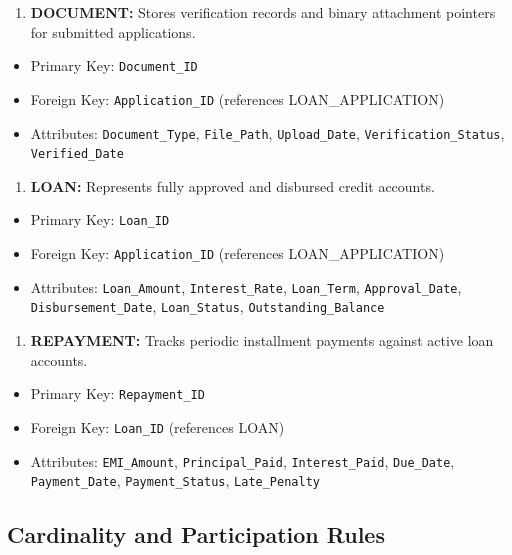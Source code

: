 \begin{enumerate}
  \item \textbf{DOCUMENT:} Stores verification records and binary attachment pointers for submitted applications.
\end{enumerate}

\begin{itemize}
  \item Primary Key: \texttt{Document\_ID}
  \item Foreign Key: \texttt{Application\_ID} (references LOAN\_APPLICATION)
  \item Attributes: \texttt{Document\_Type}, \texttt{File\_Path}, \texttt{Upload\_Date}, \texttt{Verification\_Status}, \texttt{Verified\_Date}
\end{itemize}

\begin{enumerate}
  \item \textbf{LOAN:} Represents fully approved and disbursed credit accounts.
\end{enumerate}

\begin{itemize}
  \item Primary Key: \texttt{Loan\_ID}
  \item Foreign Key: \texttt{Application\_ID} (references LOAN\_APPLICATION)
  \item Attributes: \texttt{Loan\_Amount}, \texttt{Interest\_Rate}, \texttt{Loan\_Term}, \texttt{Approval\_Date}, \texttt{Disbursement\_Date}, \texttt{Loan\_Status}, \texttt{Outstanding\_Balance}
\end{itemize}

\begin{enumerate}
  \item \textbf{REPAYMENT:} Tracks periodic installment payments against active loan accounts.
\end{enumerate}

\begin{itemize}
  \item Primary Key: \texttt{Repayment\_ID}
  \item Foreign Key: \texttt{Loan\_ID} (references LOAN)
  \item Attributes: \texttt{EMI\_Amount}, \texttt{Principal\_Paid}, \texttt{Interest\_Paid}, \texttt{Due\_Date}, \texttt{Payment\_Date}, \texttt{Payment\_Status}, \texttt{Late\_Penalty}
\end{itemize}

\subsection{Cardinality and Participation Rules}


